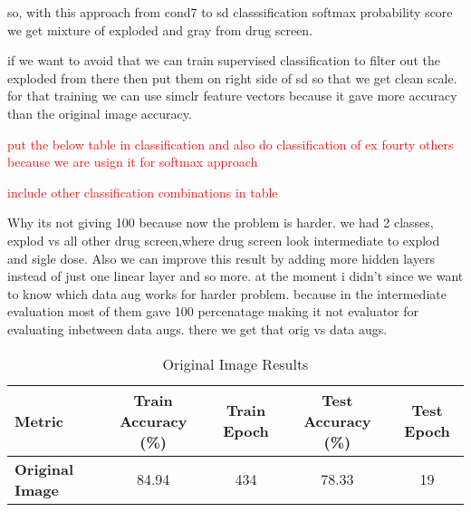so, with this approach from cond7 to sd classsification softmax probability score we get mixture of exploded and gray from drug screen.

if we want to avoid that we can train supervised classification to filter out the exploded from there then put them on right side of sd so that we get clean scale.
for that training we can use simclr feature vectors because it gave more accuracy than the original image accuracy.

\textcolor{red}{put the below table in classification and also do classification of ex fourty others because we are usign it for softmax approach} 

\begin{table}[H]
  \centering
  \caption{Performance metrics for different augmentation strategies before the projection head.}
  \label{tab:augmentation_metrics}
\end{table}

\textcolor{red}{include other classification combinations in table}

Why its not giving 100 because now the problem is harder. we had 2 classes, explod vs all other drug screen,where drug screen look intermediate to explod and sigle dose.
Also we can improve this result by adding more hidden layers instead of just one linear layer and so more. at the moment i didn't since we want to know which data aug works for harder problem.
because in the intermediate evaluation  most of them gave 100 percenatage making it not  evaluator for evaluating inbetween data augs. there we get that orig vs data augs.

\begin{table}[h!]
  \centering
  \caption{Original Image Results}
  \label{tab:original_image_results}
  \begin{tabular}{lcccc}
  \toprule
  \textbf{Metric}         & \textbf{Train Accuracy (\%)} & \textbf{Train Epoch} & \textbf{Test Accuracy (\%)} & \textbf{Test Epoch} \\ \midrule
  \textbf{Original Image} & 84.94                        & 434                   & 78.33                        & 19                  \\ 
  \bottomrule
  \end{tabular}
\end{table}


